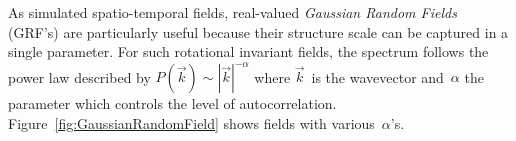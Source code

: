 \documentclass[ijgi,article,submit,moreauthors,pdftex,10pt,a4paper]{Definitions/mdpi}
\begin{document}
As simulated spatio-temporal fields, real-valued \textit{Gaussian Random Fields} (GRF's) are particularly useful because their structure scale can be captured in a single parameter. For such rotational invariant fields, the spectrum follows the power law described by $P(\vec{k}) \sim |\vec{k}|^{-\alpha}$ where $\vec{k} \,$ is the wavevector and~$\alpha$ the parameter which controls the level of autocorrelation. Figure~\ref{fig:GaussianRandomField} shows fields with various~$\alpha$'s.

\begin{figure}[H]
\centering
{}
\hspace{8mm}

\end{figure}
\end{document}
